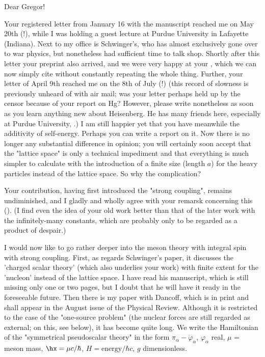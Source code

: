 \date{July 20, 1942}

Dear Gregor!

Your registered letter from January 16 with the manuscript reached me on May 20th (!), while I was holding a guest lecture at Purdue University in Lafayette (Indiana). Next to my office is Schwinger's, who has almost exclusively gone over to war physics, but nonetheless had sufficient time to talk shop. Shortly after this letter your preprint also arrived, and we were very happy at your , which we can now simply cite without constantly repeating the whole thing. Further, your letter of April 9th reached me on the 8th of July (!) (this record of slowness is previously unheard of with air mail; was your letter perhaps held up by the censor because of your report on Hg? However, please write nonetheless as soon as you learn anything new about Heisenberg. He has many friends here, especially at Purdue University, .) I am still happier yet that you have meanwhile  the additivity of self-energy. Perhaps you can write a report on it. Now there is no longer any substantial difference in opinion; you will certainly soon accept that the "lattice space" is only a technical impediment and that everything is much simpler to calculate with the introduction of a finite size (length $a$) for the heavy particles instead of the lattice space. So why the complication?

Your contribution, having first introduced the "strong coupling", remains undiminished, and I gladly and wholly agree with your remarsk concerning this (). (I find even the idea of your old work better than that of the later work with the infinitely-many constants, which are probably only to be regarded as a product of despair.)

I would now like to go rather deeper into the meson theory with integral spin with strong coupling. First, as regards Schwinger's paper, it discusses the 'charged scalar theory' (which also underlies your work) with finite extent for the 'nucleon' instead of the lattice space. I have read his manuscript, which is still missing only one or two pages, but I doubt that he will have it ready in the foreseeable future. Then there is my paper with Dancoff, which is in print and shall appear in the August issue of the Physical Review. Although it is restricted to the case of the "one-source problem" (the nuclear forces are still regarded as external; on this, see below), it has become quite long. We write the Hamiltonian of the "symmetrical pseudoscalar theory" in the form
$\pi_\alpha - \dot{\varphi}_\alpha$, $\varphi_\alpha$ real, $\mu$ = meson mass, $\hx = \mu c/\hbar$, $H=\text{energy}/\hbar c$, $g$ dimensionless.


